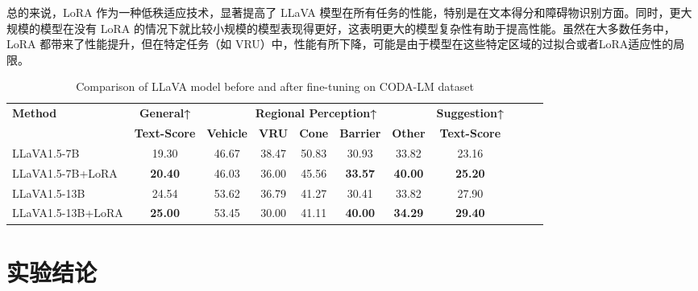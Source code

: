 \documentclass[
    linespread = 1.25
]{ctexart}
\begin{document}
总的来说，LoRA 作为一种低秩适应技术，显著提高了 LLaVA 模型在所有任务的性能，特别是在文本得分和障碍物识别方面。同时，更大规模的模型在没有 LoRA 的情况下就比较小规模的模型表现得更好，这表明更大的模型复杂性有助于提高性能。虽然在大多数任务中，LoRA 都带来了性能提升，但在特定任务（如 VRU）中，性能有所下降，可能是由于模型在这些特定区域的过拟合或者LoRA适应性的局限。
\begin{table}[htbp]
  \centering
  \caption{Comparison of LLaVA model before and after fine-tuning on CODA-LM dataset}
  \label{CODA-LM result}
  \small %
  \begin{tabular}{lcccccccccc}
    \toprule
    \textbf{Method}   & \textbf{General↑}   & \multicolumn{5}{c}{\textbf{Regional Perception↑}} & \textbf{Suggestion↑}                                                                           \\
    \cmidrule(r){3-7}
                      & \textbf{Text-Score} & \textbf{Vehicle}                                  & \textbf{VRU}         & \textbf{Cone} & \textbf{Barrier} & \textbf{Other} & \textbf{Text-Score} \\
    \midrule
    LLaVA1.5-7B       & 19.30               & 46.67                                             & 38.47                & 50.83         & 30.93            & 33.82          & 23.16               \\
    LLaVA1.5-7B+LoRA  & \textbf{20.40}      & 46.03                                             & 36.00                & 45.56         & \textbf{33.57}   & \textbf{40.00} & \textbf{25.20}      \\
    \midrule
    LLaVA1.5-13B      & 24.54               & 53.62                                             & 36.79                & 41.27         & 30.41            & 33.82          & 27.90               \\
    LLaVA1.5-13B+LoRA & \textbf{25.00}      & 53.45                                             & 30.00                & 41.11         & \textbf{40.00}   & \textbf{34.29} & \textbf{29.40}      \\
    \bottomrule
  \end{tabular}
\end{table}



\section{实验结论}

\appendix
\newpage
\end{document}

